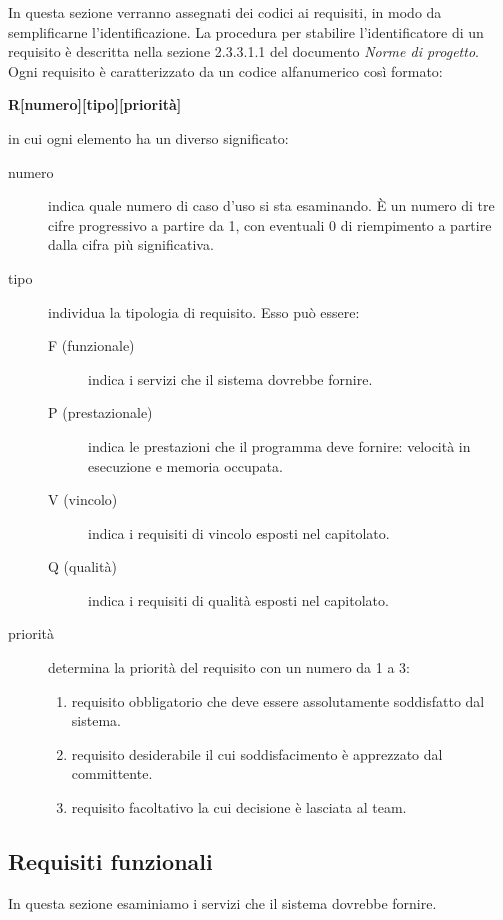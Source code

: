 \documentclass[../analisi-dei-requisiti.tex]{subfiles}
\begin{document}
In questa sezione verranno assegnati dei codici ai requisiti, in modo da semplificarne l’identificazione.
La procedura per stabilire l'identificatore di un requisito è descritta nella sezione 2.3.3.1.1 del documento \textit{Norme di progetto}.
Ogni requisito è caratterizzato da un codice alfanumerico così formato:
\begin{center}
  \textbf{R[numero][tipo][priorità]}
\end{center}
in cui ogni elemento ha un diverso significato:
\begin{description}
  \item [numero] indica quale numero di caso d'uso si sta esaminando. È un numero di tre cifre progressivo a partire da 1, con eventuali 0 di riempimento a partire dalla cifra più significativa.
  \item [tipo] individua la tipologia di requisito. Esso può essere:
        \begin{description}
          \item [F (funzionale)] indica i servizi che il sistema dovrebbe fornire.
          \item [P (prestazionale)] indica le prestazioni che il programma deve fornire: velocità in esecuzione e memoria occupata.
          \item [V (vincolo)] indica i requisiti di vincolo esposti nel capitolato.
          \item [Q (qualità)] indica i requisiti di qualità esposti nel capitolato.
        \end{description}
  \item [priorità] determina la priorità del requisito con un numero da 1 a 3:
        \begin{enumerate}
          \item requisito obbligatorio che deve essere assolutamente soddisfatto dal sistema.
          \item requisito desiderabile il cui soddisfacimento è apprezzato dal committente.
          \item requisito facoltativo la cui decisione è lasciata al team.
        \end{enumerate}
\end{description}

\subsection{Requisiti funzionali}%
\label{sub:requisiti_funzionali}
In questa sezione esaminiamo i servizi che il sistema dovrebbe fornire.
\end{document}
